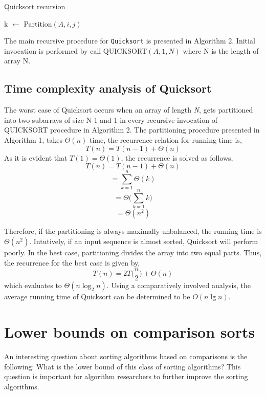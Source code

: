 \documentclass[a4paper, 10pt,twocolumn]{article}
\begin{document}
\begin{algorithm}[t]
    \caption{Quicksort recursion}
    \label{alg:in2}
    \begin{algorithmic}[1]
     \newline
            \State k $\leftarrow$ Partition$(A,i,j)$
      \EndIf
     \EndProcedure
    \end{algorithmic}
\end{algorithm}

The main recursive procedure for \texttt{Quicksort} is presented in Algorithm 2. Initial invocation is performed by call QUICKSORT$(A,1,N)$ where N is the length of array N.
\subsection{Time complexity analysis of Quicksort}
The worst case of Quicksort occurs when an array of length \textit{N}, gets partitioned into two subarrays of size N-1 and 1 in every recursive invocation of QUICKSORT procedure in Algorithm 2. The partitioning procedure presented in Algorithm 1, takes $\Theta(n)$ time, the recurrence relation for running time is,
$$T(n) = T(n-1) + \Theta(n)$$
As it is evident that $T(1) = \Theta(1)$, the recurrence is solved as follows,
$$T(n) = T(n-1) + \Theta(n)$$
$$ = \sum_{k=1}^{n}\Theta(k) $$
$$ = \Theta \Big( \sum_{k=1}^{n} k \Big) $$
$$ = \Theta (n^2) $$

Therefore, if the partitioning is always maximally unbalanced, the running time is $\Theta(n^2)$. Intutively, if an input sequence is almost sorted, Quicksort will perform poorly. In the best case, partitioning divides the array into two equal parts. Thus, the recurrence for the best case is given by,
$$ T(n) = 2T\Big(\frac{n}{2}\Big)+\Theta(n)$$
which evaluates to $\Theta(n\log_2{n})$. Using a comparatively involved analysis, the average running time of Quicksort can be determined to be $O(n\lg{n})$.


\section{Lower bounds on comparison sorts}
An interesting question about sorting algorithms based on comparisons is the following: What is the lower bound of this class of sorting algorithms? This question is important for algorithm researchers to further improve the sorting algorithms.
\end{document}
